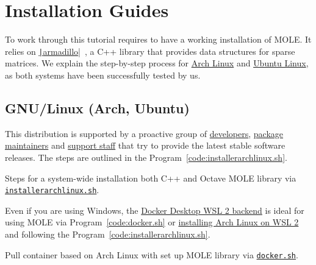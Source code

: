 \chapter{Installation Guides}

To work through this tutorial requires to have a working installation
of MOLE.
It relies on
\href{https://gitlab.com/conradsnicta/armadillo-code}{\texttt|armadillo|}~\cite{Sanderson2025},
a C++ library that provides data structures for sparse matrices.
We explain the step-by-step process for
\href{https://wiki.archlinux.org/title/Pacman/Rosetta}{Arch Linux}
and \href{https://help.ubuntu.com/lts/ubuntu-help/index.html}{Ubuntu Linux},
as both systems have been successfully tested by us.

\section{GNU/Linux (Arch, Ubuntu)}

This distribution is supported by a proactive group of
\href{https://archlinux.org/people/developers}{developers},
\href{https://archlinux.org/people/package-maintainers}{package maintainers}
and \href{https://archlinux.org/people/support-staff}{support staff}
that try to provide the latest stable software releases.
The steps are outlined in the Program~\ref{code:installerarchlinux.sh}.

\begin{listing}[ht!]
	\tiny
	\centering
	\caption{Steps for a system-wide installation both C++ and Octave
		MOLE library via
		\href{https://raw.githubusercontent.com/carlosal1015/mole_examples/main/tutorial/installerarchlinux.sh}{\texttt{installerarchlinux.sh}}.}
	\label{code:installerarchlinux.sh}
\end{listing}

Even if you are using Windows, the
\href{https://docs.docker.com/desktop/features/wsl}{Docker Desktop WSL 2 backend}
is ideal for using MOLE via Program~\ref{code:docker.sh} or
\href{https://wiki.archlinux.org/title/Install_Arch_Linux_on_WSL}{installing Arch Linux on WSL 2} and following
the Program~\ref{code:installerarchlinux.sh}.

\begin{listing}[ht!]
	\tiny
	\centering
	\caption{Pull container based on Arch Linux with set up MOLE
		library via \href{https://raw.githubusercontent.com/carlosal1015/mole_examples/main/tutorial/docker.sh}{\texttt{docker.sh}}.}
	\label{code:docker.sh}
\end{listing}

